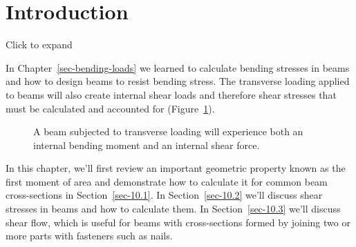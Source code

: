 \documentclass[
  letterpaper,
  DIV=11,
  numbers=noendperiod]{scrreprt}
\theoremstyle{definition}
\theoremstyle{remark}
\begin{document}
\section*{Introduction}\label{introduction-9}


Click to expand

In Chapter~\ref{sec-bending-loads} we learned to calculate bending
stresses in beams and how to design beams to resist bending stress. The
transverse loading applied to beams will also create internal shear
loads and therefore shear stresses that must be calculated and accounted
for (Figure~\ref{fig-10.1}).

\begin{figure}


\caption{\label{fig-10.1}A beam subjected to transverse loading will
experience both an internal bending moment and an internal shear force.}

\end{figure}%

In this chapter, we'll first review an important geometric property
known as the first moment of area and demonstrate how to calculate it
for common beam cross-sections in Section~\ref{sec-10.1}. In
Section~\ref{sec-10.2} we'll discuss shear stresses in beams and how to
calculate them. In Section~\ref{sec-10.3} we'll discuss shear flow,
which is useful for beams with cross-sections formed by joining two or
more parts with fasteners such as nails.
\end{document}
